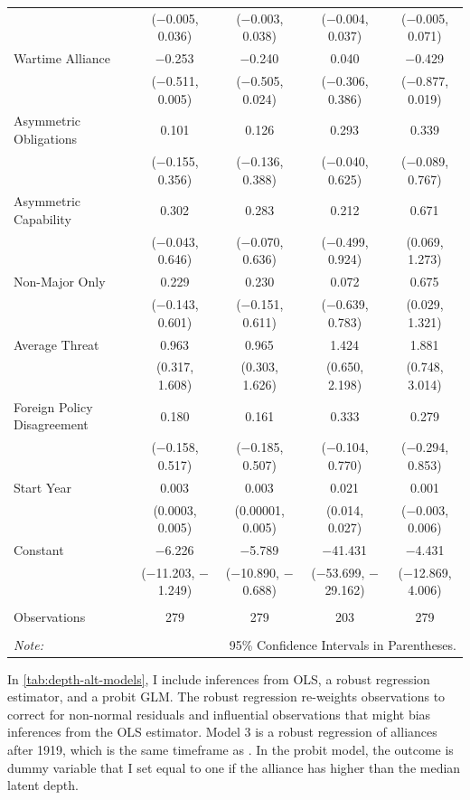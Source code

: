 \documentclass[12pt]{article}
\begin{document}
\begin{table}[!htbp]
\begin{adjustbox}{width= .95\textwidth, center}
\begin{tabular}{@{\extracolsep{5pt}}lcccc}
  & ($-$0.005, 0.036) & ($-$0.003, 0.038) & ($-$0.004, 0.037) & ($-$0.005, 0.071) \\ 
  Wartime Alliance & $-$0.253$^{}$ & $-$0.240$^{}$ & 0.040 & $-$0.429$^{}$ \\ 
  & ($-$0.511, 0.005) & ($-$0.505, 0.024) & ($-$0.306, 0.386) & ($-$0.877, 0.019) \\ 
  Asymmetric Obligations & 0.101 & 0.126 & 0.293$^{}$ & 0.339 \\ 
  & ($-$0.155, 0.356) & ($-$0.136, 0.388) & ($-$0.040, 0.625) & ($-$0.089, 0.767) \\ 
  Asymmetric Capability & 0.302$^{}$ & 0.283 & 0.212 & 0.671$^{}$ \\ 
  & ($-$0.043, 0.646) & ($-$0.070, 0.636) & ($-$0.499, 0.924) & (0.069, 1.273) \\ 
  Non-Major Only & 0.229 & 0.230 & 0.072 & 0.675$^{}$ \\ 
  & ($-$0.143, 0.601) & ($-$0.151, 0.611) & ($-$0.639, 0.783) & (0.029, 1.321) \\ 
  Average Threat & 0.963$^{}$ & 0.965$^{}$ & 1.424$^{}$ & 1.881$^{}$ \\ 
  & (0.317, 1.608) & (0.303, 1.626) & (0.650, 2.198) & (0.748, 3.014) \\ 
  Foreign Policy Disagreement & 0.180 & 0.161 & 0.333 & 0.279 \\ 
  & ($-$0.158, 0.517) & ($-$0.185, 0.507) & ($-$0.104, 0.770) & ($-$0.294, 0.853) \\ 
  Start Year & 0.003$^{}$ & 0.003$^{}$ & 0.021$^{}$ & 0.001 \\ 
  & (0.0003, 0.005) & (0.00001, 0.005) & (0.014, 0.027) & ($-$0.003, 0.006) \\ 
  Constant & $-$6.226$^{}$ & $-$5.789$^{}$ & $-$41.431$^{}$ & $-$4.431 \\ 
  & ($-$11.203, $-$1.249) & ($-$10.890, $-$0.688) & ($-$53.699, $-$29.162) & ($-$12.869, 4.006) \\ 
 \hline \\[-1.8ex] 
Observations & 279 & 279 & 203 & 279 \\ 
\hline 
\hline \\[-1.8ex] 
\textit{Note:}  & \multicolumn{4}{r}{95\% Confidence Intervals in Parentheses.} \\ 
\end{tabular}
\end{adjustbox} 
\end{table} 


In \autoref{tab:depth-alt-models}, I include inferences from OLS, a robust regression estimator, and a probit GLM. 
The robust regression re-weights observations to correct for non-normal residuals and influential observations that might bias inferences from the OLS estimator. 
Model 3 is a robust regression of alliances after 1919, which is the same timeframe as \citep{Mattes2012}. 
In the probit model, the outcome is dummy variable that I set equal to one if the alliance has higher than the median latent depth. 
\end{document}
